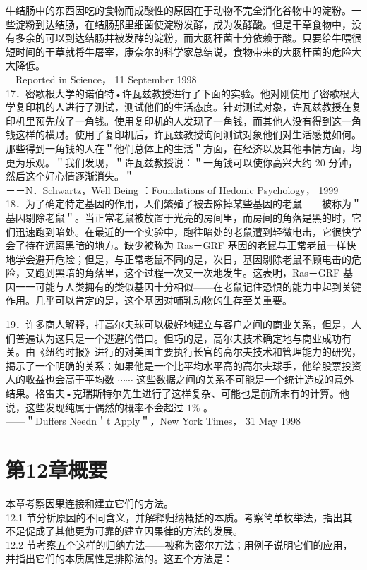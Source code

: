 牛结肠中的东西因吃的食物而成酸性的原因在于动物不完全消化谷物中的淀粉。一些淀粉到达结肠，在结肠那里细菌使淀粉发酵，成为发酵酸。但是干草食物中，没有多余的可以到达结肠并被发酵的淀粉，而大肠杆菌十分依赖于酸。只要给牛喂很短时间的干草就将牛屠宰，康奈尔的科学家总结说，食物带来的大肠杆菌的危险大大降低。\\
－Reported in Science， 11 September 1998\\
17．密歇根大学的诺伯特•许瓦兹教授进行了下面的实验。他对刚使用了密歌根大学复印机的人进行了测试，测试他们的生活态度。针对测试对象，许瓦兹教授在复印机里预先放了一角钱。使用复印机的人发现了一角钱，而其他人没有得到这一角钱这样的横财。使用了复印机后，许瓦兹教授询问测试对象他们对生活感觉如何。那些得到一角钱的人在＂他们总体上的生活＂方面，在经济以及其他事情方面，均更为乐观。＂我们发现，＂许瓦兹教授说：＂一角钱可以使你高兴大约 20 分钟，然后这个好心情逐渐消失。＂\\
－－N．Schwartz，Well Being ：Foundations of Hedonic Psychology， 1999\\
18．为了确定特定基因的作用，人们繁殖了被去除掉某些基因的老鼠——被称为＂基因剔除老鼠＂。当正常老鼠被放置于光亮的房间里，而房间的角落是黑的时，它们迅速跑到暗处。在最近的一个实验中，跑往暗处的老鼠遭到轻微电击，它很快学会了待在远离黑暗的地方。缺少被称为 Ras－GRF 基因的老鼠与正常老鼠一样快地学会避开危险；但是，与正常老鼠不同的是，次日，基因剔除老鼠不顾电击的危险，又跑到黑暗的角落里，这个过程一次又一次地发生。这表明，Ras－GRF 基因一一可能与人类拥有的类似基因十分相似——在老鼠记住恐惧的能力中起到关键作用。几乎可以肯定的是，这个基因对哺乳动物的生存至关重要。

19．许多商人解释，打高尔夫球可以极好地建立与客户之间的商业关系，但是，人们普遍认为这只是一个逃避的借口。但巧的是，高尔夫技术确定地与商业成功有关。由《纽约时报》进行的对美国主要执行长官的高尔夫技术和管理能力的研究，揭示了一个明确的关系：如果他是一个比平均水平高的高尔夫球手，他给股票投资人的收益也会高于平均数 $\cdots \cdots$ 这些数据之间的关系不可能是一个统计造成的意外结果。格雷夫•克瑞斯特尔先生进行了这样复杂、可能也是前所末有的计算。他说，这些发现纯属于偶然的概率不会超过 $1 \%$ 。\\
——＂Duffers Needn＇t Apply＂，New York Times， 31 May 1998

\section*{第12章概要}
本章考察因果连接和建立它们的方法。\\
12.1 节分析原因的不同含义，并解释归纳概括的本质。考察简单枚举法，指出其不足促成了其他更为可靠的建立因果律的方法的发展。\\
12.2 节考察五个这样的归纳方法——被称为密尔方法；用例子说明它们的应用，并指出它们的本质属性是排除法的。这五个方法是：

